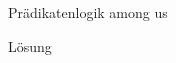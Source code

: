 \begin{frame}[fragile]{Prädikatenlogik among us}

\end{frame}

\begin{frame}{Lösung}

\end{frame}


